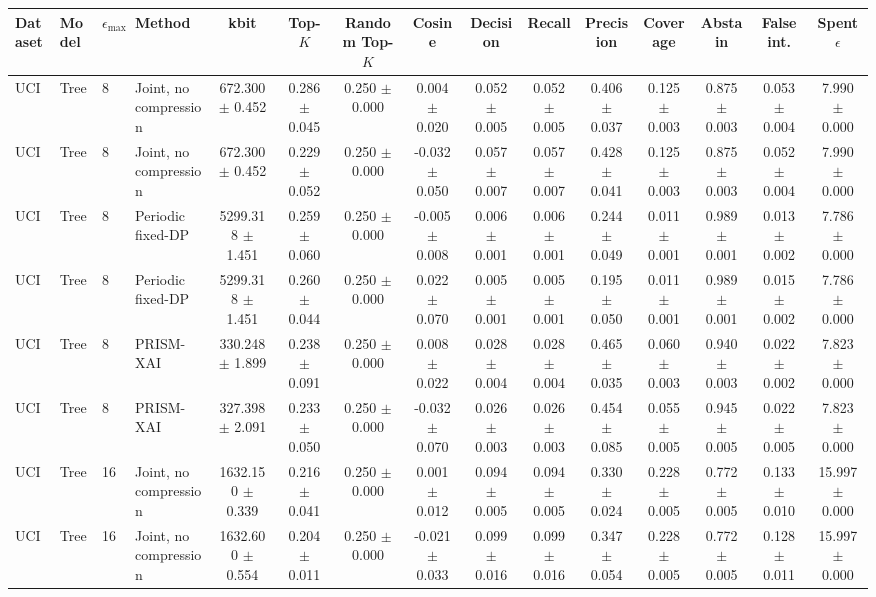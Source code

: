 \begin{tabular}{llllccccccccccc}
\toprule
Dataset & Model & $\epsilon_{\max}$ & Method & kbit & Top-$K$ & Random Top-$K$ & Cosine & Decision & Recall & Precision & Coverage & Abstain & False int. & Spent $\epsilon$ \\
\midrule
UCI & Tree & 8 & Joint, no compression & 672.300 $\pm$ 0.452 & 0.286 $\pm$ 0.045 & 0.250 $\pm$ 0.000 & 0.004 $\pm$ 0.020 & 0.052 $\pm$ 0.005 & 0.052 $\pm$ 0.005 & 0.406 $\pm$ 0.037 & 0.125 $\pm$ 0.003 & 0.875 $\pm$ 0.003 & 0.053 $\pm$ 0.004 & 7.990 $\pm$ 0.000 \\
UCI & Tree & 8 & Joint, no compression & 672.300 $\pm$ 0.452 & 0.229 $\pm$ 0.052 & 0.250 $\pm$ 0.000 & -0.032 $\pm$ 0.050 & 0.057 $\pm$ 0.007 & 0.057 $\pm$ 0.007 & 0.428 $\pm$ 0.041 & 0.125 $\pm$ 0.003 & 0.875 $\pm$ 0.003 & 0.052 $\pm$ 0.004 & 7.990 $\pm$ 0.000 \\
UCI & Tree & 8 & Periodic fixed-DP & 5299.318 $\pm$ 1.451 & 0.259 $\pm$ 0.060 & 0.250 $\pm$ 0.000 & -0.005 $\pm$ 0.008 & 0.006 $\pm$ 0.001 & 0.006 $\pm$ 0.001 & 0.244 $\pm$ 0.049 & 0.011 $\pm$ 0.001 & 0.989 $\pm$ 0.001 & 0.013 $\pm$ 0.002 & 7.786 $\pm$ 0.000 \\
UCI & Tree & 8 & Periodic fixed-DP & 5299.318 $\pm$ 1.451 & 0.260 $\pm$ 0.044 & 0.250 $\pm$ 0.000 & 0.022 $\pm$ 0.070 & 0.005 $\pm$ 0.001 & 0.005 $\pm$ 0.001 & 0.195 $\pm$ 0.050 & 0.011 $\pm$ 0.001 & 0.989 $\pm$ 0.001 & 0.015 $\pm$ 0.002 & 7.786 $\pm$ 0.000 \\
UCI & Tree & 8 & PRISM-XAI & 330.248 $\pm$ 1.899 & 0.238 $\pm$ 0.091 & 0.250 $\pm$ 0.000 & 0.008 $\pm$ 0.022 & 0.028 $\pm$ 0.004 & 0.028 $\pm$ 0.004 & 0.465 $\pm$ 0.035 & 0.060 $\pm$ 0.003 & 0.940 $\pm$ 0.003 & 0.022 $\pm$ 0.002 & 7.823 $\pm$ 0.000 \\
UCI & Tree & 8 & PRISM-XAI & 327.398 $\pm$ 2.091 & 0.233 $\pm$ 0.050 & 0.250 $\pm$ 0.000 & -0.032 $\pm$ 0.070 & 0.026 $\pm$ 0.003 & 0.026 $\pm$ 0.003 & 0.454 $\pm$ 0.085 & 0.055 $\pm$ 0.005 & 0.945 $\pm$ 0.005 & 0.022 $\pm$ 0.005 & 7.823 $\pm$ 0.000 \\
UCI & Tree & 16 & Joint, no compression & 1632.150 $\pm$ 0.339 & 0.216 $\pm$ 0.041 & 0.250 $\pm$ 0.000 & 0.001 $\pm$ 0.012 & 0.094 $\pm$ 0.005 & 0.094 $\pm$ 0.005 & 0.330 $\pm$ 0.024 & 0.228 $\pm$ 0.005 & 0.772 $\pm$ 0.005 & 0.133 $\pm$ 0.010 & 15.997 $\pm$ 0.000 \\
UCI & Tree & 16 & Joint, no compression & 1632.600 $\pm$ 0.554 & 0.204 $\pm$ 0.011 & 0.250 $\pm$ 0.000 & -0.021 $\pm$ 0.033 & 0.099 $\pm$ 0.016 & 0.099 $\pm$ 0.016 & 0.347 $\pm$ 0.054 & 0.228 $\pm$ 0.005 & 0.772 $\pm$ 0.005 & 0.128 $\pm$ 0.011 & 15.997 $\pm$ 0.000 \\

\end{tabular}
